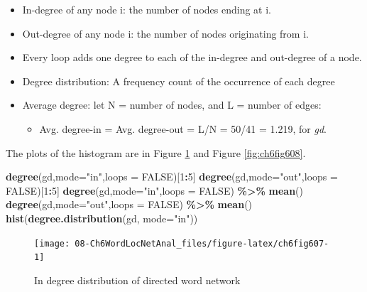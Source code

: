 \documentclass[
]{article}
\newenvironment{Shaded}{\begin{snugshade}}{\end{snugshade}}
\newcommand{\AttributeTok}[1]{\textcolor[rgb]{0.13,0.29,0.53}{#1}}
\newcommand{\ConstantTok}[1]{\textcolor[rgb]{0.56,0.35,0.01}{#1}}
\newcommand{\DecValTok}[1]{\textcolor[rgb]{0.00,0.00,0.81}{#1}}
\newcommand{\FunctionTok}[1]{\textcolor[rgb]{0.13,0.29,0.53}{\textbf{#1}}}
\newcommand{\NormalTok}[1]{#1}
\newcommand{\SpecialCharTok}[1]{\textcolor[rgb]{0.81,0.36,0.00}{\textbf{#1}}}
\newcommand{\StringTok}[1]{\textcolor[rgb]{0.31,0.60,0.02}{#1}}
\providecommand{\tightlist}{%
  \setlength{\itemsep}{0pt}\setlength{\parskip}{0pt}}
\begin{document}
\begin{itemize}
\tightlist
\item
  In-degree of any node i: the number of nodes ending at i.
\item
  Out-degree of any node i: the number of nodes originating from i.
\item
  Every loop adds one degree to each of the in-degree and out-degree of a node.
\item
  Degree distribution: A frequency count of the occurrence of each degree
\item
  Average degree: let N = number of nodes, and L = number of edges:

  \begin{itemize}
  \tightlist
  \item
    Avg. degree-in = Avg. degree-out = L/N = 50/41 = 1.219, for \emph{gd}.
  \end{itemize}
\end{itemize}

The plots of the histogram are in Figure \ref{fig:ch6fig607} and Figure \ref{fig:ch6fig608}.

\begin{Shaded}
\begin{Highlighting}[]
\FunctionTok{degree}\NormalTok{(gd,}\AttributeTok{mode=}\StringTok{"in"}\NormalTok{,}\AttributeTok{loops =} \ConstantTok{FALSE}\NormalTok{)[}\DecValTok{1}\SpecialCharTok{:}\DecValTok{5}\NormalTok{]}
\FunctionTok{degree}\NormalTok{(gd,}\AttributeTok{mode=}\StringTok{"out"}\NormalTok{,}\AttributeTok{loops =} \ConstantTok{FALSE}\NormalTok{)[}\DecValTok{1}\SpecialCharTok{:}\DecValTok{5}\NormalTok{]}
\FunctionTok{degree}\NormalTok{(gd,}\AttributeTok{mode=}\StringTok{"in"}\NormalTok{,}\AttributeTok{loops =} \ConstantTok{FALSE}\NormalTok{) }\SpecialCharTok{\%\textgreater{}\%} \FunctionTok{mean}\NormalTok{()}
\FunctionTok{degree}\NormalTok{(gd,}\AttributeTok{mode=}\StringTok{"out"}\NormalTok{,}\AttributeTok{loops =} \ConstantTok{FALSE}\NormalTok{) }\SpecialCharTok{\%\textgreater{}\%} \FunctionTok{mean}\NormalTok{()}
\FunctionTok{hist}\NormalTok{(}\FunctionTok{degree.distribution}\NormalTok{(gd, }\AttributeTok{mode=}\StringTok{"in"}\NormalTok{))}
\end{Highlighting}
\end{Shaded}

\begin{figure}

{\centering \texttt{[image: 08-Ch6WordLocNetAnal\_files/figure-latex/ch6fig607-1]} 

}

\caption{In degree distribution of directed word network}\label{fig:ch6fig607}
\end{figure}
\end{document}
